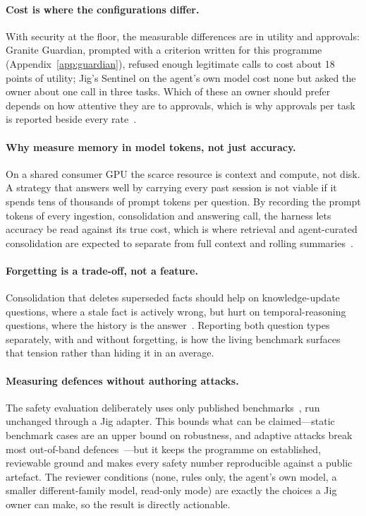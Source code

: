 \paragraph{Cost is where the configurations differ.} With security at the floor, the measurable
differences are in utility and approvals: Granite Guardian, prompted with a criterion written for this
programme (Appendix~\ref{app:guardian}), refused enough legitimate calls to cost about 18 points of
utility; Jig's Sentinel on the agent's own model cost none but asked the owner about one call in three
tasks. Which of these an owner should prefer depends on how attentive they are to approvals, which is why
approvals per task is reported beside every rate~\citep{yu2026habituation}.

\paragraph{Why measure memory in model tokens, not just accuracy.} On a shared consumer GPU the scarce
resource is context and compute, not disk. A strategy that answers well by carrying every past session is
not viable if it spends tens of thousands of prompt tokens per question. By recording the prompt tokens of
every ingestion, consolidation and answering call, the harness lets accuracy be read against its true
cost, which is where retrieval and agent-curated consolidation are expected to separate from full context
and rolling summaries~\citep{wu2024longmemeval,chhikara2025mem0}.

\paragraph{Forgetting is a trade-off, not a feature.} Consolidation that deletes superseded facts should
help on knowledge-update questions, where a stale fact is actively wrong, but hurt on temporal-reasoning
questions, where the history is the answer~\citep{uddin2026memora,kwon2026manufactured}. Reporting both
question types separately, with and without forgetting, is how the living benchmark surfaces that tension
rather than hiding it in an average.

\paragraph{Measuring defences without authoring attacks.} The safety evaluation deliberately uses only
published benchmarks~\citep{debenedetti2024agentdojo,zhan2024injecagent}, run unchanged through a Jig
adapter. This bounds what can be claimed---static benchmark cases are an upper bound on robustness, and
adaptive attacks break most out-of-band defences~\citep{narisetty2026adaptive}---but it keeps the
programme on established, reviewable ground and makes every safety number reproducible against a public
artefact. The reviewer conditions (none, rules only, the agent's own model, a smaller different-family
model, read-only mode) are exactly the choices a Jig owner can make, so the result is directly actionable.

